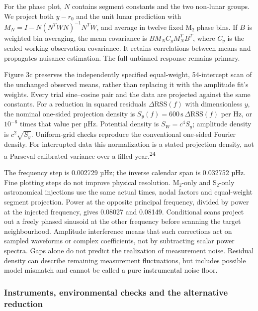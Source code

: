 \documentclass[
  10pt,
  a4paper,
]{article}
\begin{document}
For the phase plot, \(N\) contains segment constants and the two
non-lunar groups. We project both \(y-r_0\) and the unit lunar
prediction with \(M_N=I-N(N^TWN)^{-1}N^TW\), and average in twelve fixed
M₂ phase bins. If \(B\) is weighted bin averaging, the mean covariance
is \(BM_NC_yM_N^TB^T\), where \(C_y\) is the scaled working observation
covariance. It retains correlations between means and propagates
nuisance estimation. The full unbinned response remains primary.

Figure 3c preserves the independently specified equal-weight,
54-intercept scan of the unchanged observed means, rather than replacing
it with the amplitude fit's weights. Every trial sine--cosine pair and
the data are projected against the same constants. For a reduction in
squared residuals \(\Delta\mathrm{RSS}(f)\) with dimensionless \(y\),
the nominal one-sided projection density is
\(S_y(f)=600\,\mathrm{s}\,\Delta\mathrm{RSS}(f)\) per Hz, or \(10^{-6}\)
times that value per µHz. Potential density is \(S_W=c^4S_y\); amplitude
density is \(c^2\sqrt{S_y}\). Uniform-grid checks reproduce the
conventional one-sided Fourier density. For interrupted data this
normalization is a stated projection density, not a Parseval-calibrated
variance over a filled year.\textsuperscript{24}

The frequency step is 0.002729 µHz; the inverse calendar span is
0.032752 µHz. Fine plotting steps do not improve physical resolution.
M₂-only and S₂-only astronomical injections use the same actual times,
nodal factors and equal-weight segment projection. Power at the opposite
principal frequency, divided by power at the injected frequency, gives
0.08027 and 0.08149. Conditional scans project out a freely phased
sinusoid at the other frequency before scanning the target
neighbourhood. Amplitude interference means that such corrections act on
sampled waveforms or complex coefficients, not by subtracting scalar
power spectra. Gaps alone do not predict the realization of measurement
noise. Residual density can describe remaining measurement fluctuations,
but includes possible model mismatch and cannot be called a pure
instrumental noise floor.

\hypertarget{instruments-environmental-checks-and-the-alternative-reduction}{%
\subsubsection{Instruments, environmental checks and the alternative
reduction}\label{instruments-environmental-checks-and-the-alternative-reduction}}
\end{document}
